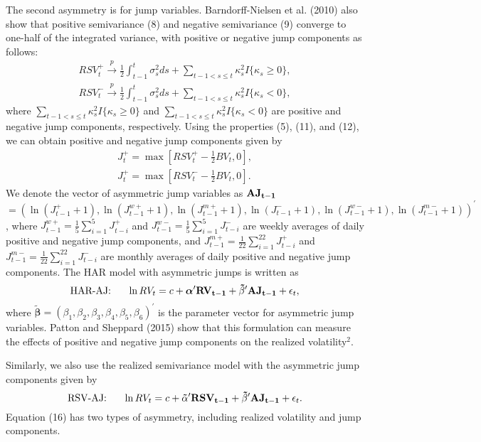 \documentclass[10pt]{article}
\begin{document}
The second asymmetry is for jump variables. 
Barndorff-Nielsen et al. (2010) also show that positive semivariance (8) and negative semivariance (9) converge to one-half of the integrated variance, with positive or negative jump components as follows: 
\begin{gather}
RSV_t^{+}  \stackrel{p}{\to} \frac{1}{2}\int_{t-1}^t \sigma_s^2 ds + \sum_{t-1<s \le t} \kappa_s^2 I\{\kappa_s \ge 0 \}, \\
RSV_t^{-}  \stackrel{p}{\to} \frac{1}{2}\int_{t-1}^t \sigma_s^2 ds + \sum_{t-1<s \le t} \kappa_s^2 I\{\kappa_s < 0 \},  
\end{gather}
where $\sum_{t-1<s \le t} \kappa_s^2 I\{\kappa_s \ge 0 \}$ and $\sum_{t-1<s \le t} \kappa_s^2 I\{\kappa_s < 0 \}$ are positive and negative jump components, respectively. 
Using the properties (5), (11), and (12), we can obtain positive and negative jump components given by
\begin{gather}
J_t^{+}=\max [RSV_t^{+}-\frac{1}{2}BV_t,0], \\
J_t^{+}=\max [RSV_t^{-}-\frac{1}{2}BV_t,0].
\end{gather}
We denote the vector of asymmetric jump variables as ${\bf AJ_{t-1}}$$=(\ln (J_{t-1}^{+}+1), \ln (J_{t-1}^{w+}+1), \ln (J_{t-1}^{m+}+1), \ln (J_{t-1}^{-}+1), \ln (J_{t-1}^{w-}+1), \ln (J_{t-1}^{m-}+1))^{\prime}$, 
where $J_{t-1}^{w+}=\frac{1}{5}\sum_{i=1}^5 J_{t-i}^{+}$ and $J_{t-1}^{w-}=\frac{1}{5}\sum_{i=1}^5 J_{t-i}^{-}$ are weekly averages of daily positive and negative jump components, 
and $J_{t-1}^{m+}=\frac{1}{22}\sum_{i=1}^{22} J_{t-i}^{+}$ and $J_{t-1}^{m-}=\frac{1}{22}\sum_{i=1}^{22} J_{t-i}^{-}$ are monthly averages of daily positive and negative jump components. 
The HAR model with asymmetric jumps is written as 
\begin{equation}
\text{HAR-AJ:} \ \ \ \ \ \ln RV_t=c+{\boldsymbol  \alpha}^{\prime} {\bf RV_{t-1}} +{\boldsymbol  \tilde{\beta}}^{\prime} {\bf AJ_{t-1}} + \epsilon_t, 
\end{equation}
where ${\boldsymbol  \tilde{\beta}}=(\beta_1, \beta_2, \beta_3, \beta_4, \beta_5, \beta_6)^{\prime}$ is the parameter vector for asymmetric jump variables. 
Patton and Sheppard (2015) show that this formulation can measure the effects of positive and negative jump components on the realized volatility$^2$. 


Similarly, we also use the realized semivariance model with the asymmetric jump components given by
\begin{equation}
\text{RSV-AJ:} \ \ \ \ \ \ln RV_t=c+{\boldsymbol  \tilde{\alpha}}^{\prime} {\bf RSV_{t-1}} +{\boldsymbol  \tilde{\beta}}^{\prime} {\bf AJ_{t-1}} + \epsilon_t. 
\end{equation}
Equation (16) has two types of asymmetry, including realized volatility and jump components. 
\end{document}
